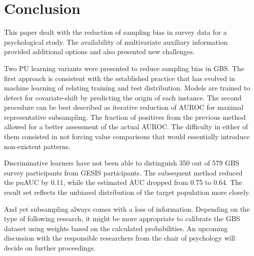 \chapter{Conclusion}\label{Sec:Conclusion}

This paper dealt with the reduction of sampling bias in survey data for a psychological study. The availability of multivariate auxiliary information provided additional options and also presented new challenges.

Two PU learning variants were presented to reduce sampling bias in GBS. The first approach is consistent with the established practice that has evolved in machine learning of relating training and test distribution. Models are trained to detect for covariate-shift by predicting the origin of each instance. The second procedure can be best described as iterative reduction of AUROC for maximal representative subsampling. The fraction of positives from the previous method allowed for a better assessment of the actual AUROC. The difficulty in either of them consisted in not forcing value comparisons that would essentially introduce non-existent patterns.

Discriminative learners have not been able to distinguish 350 out of 579 GBS survey participants from GESIS participants. The subsequent method reduced the puAUC by 0.11, while the estimated AUC dropped from 0.75 to 0.64. The result set reflects the unbiased distribution of the target population more closely.

And yet subsampling always comes with a loss of information. Depending on the type of following research, it might be more appropriate to calibrate the GBS dataset using weights based on the calculated probabilities. An upcoming discussion with the responsible researchers from the chair of psychology will decide on further proceedings.